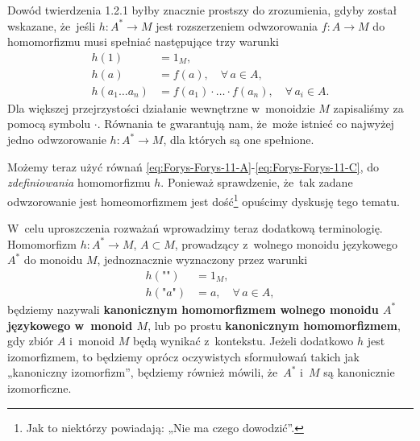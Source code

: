 \documentclass[a4paper,11pt]{article}
\begin{document}
\start {} Dowód twierdzenia 1.2.1 byłby znacznie prostszy do
zrozumienia, gdyby został wskazane, że~jeśli $h : A^{ * } \to M$ jest
rozszerzeniem odwzorowania $f : A \to M$ do homomorfizmu musi spełniać
następujące trzy warunki
\begin{subequations}
  \begin{align}
    \label{eq:Forys-Forys-11-A}
    h( 1 ) &= 1_{ M }, \\
    \label{eq:Forys-Forys-11-B}
    h( a ) &= f( a ), \quad \forall \, a \in A, \\
    \label{eq:Forys-Forys-11-C}
    h( a_{ 1 } \ldots a_{ n } )
           &= f( a_{ 1 } ) \cdot \ldots \cdot f( a_{ n } ), \quad
             \forall \, a_{ i } \in A.
  \end{align}
\end{subequations}
Dla większej przejrzystości działanie wewnętrzne w~monoidzie $M$
zapisaliśmy za pomocą symbolu $\cdot$. Równania te gwarantują nam,
że~może istnieć co najwyżej jedno odwzorowanie $h : A^{ * } \to M$,
dla których są one spełnione.

Możemy teraz użyć równań
\eqref{eq:Forys-Forys-11-A}-\eqref{eq:Forys-Forys-11-C}, do
\textit{zdefiniowania} homomorfizmu $h$. Ponieważ sprawdzenie, że~tak zadane
odwzorowanie jest homeomorfizmem jest dość\footnote{Jak to niektórzy
  powiadają: „Nie ma czego dowodzić”.} opuścimy dyskusję tego tematu.

\vspace{\spaceFour}



\start {} W~celu uproszczenia rozważań wprowadzimy teraz dodatkową
terminologię. Homomorfizm $h : A^{ * } \to M$, $A \subset M$, prowadzący z~wolnego
monoidu językowego $A^{ * }$ do monoidu $M$, jednoznacznie wyznaczony przez
warunki
\begin{subequations}
  \begin{align}
    \label{eq:Forys-Forys-12-A}
    h( \textrm{""} ) &= 1_{ M }, \\
    \label{eq:Forys-Forys-12-B}
    h( \textrm{"} a \textrm{"} ) &= a, \quad
                                   \forall \, a \in A,
  \end{align}
\end{subequations}
będziemy nazywali \textbf{kanonicznym homomorfizmem wolnego monoidu $A^{ * }$
  językowego w~monoid $M$}, lub po prostu \textbf{kanonicznym
  homomorfizmem}, gdy zbiór $A$ i~monoid $M$ będą wynikać z~kontekstu.
Jeżeli dodatkowo $h$ jest izomorfizmem, to będziemy oprócz oczywistych
sformułowań takich jak „kanoniczny izomorfizm”, będziemy również mówili,
że~$A^{ * }$ i~$M$ są kanonicznie izomorficzne.
\end{document}

